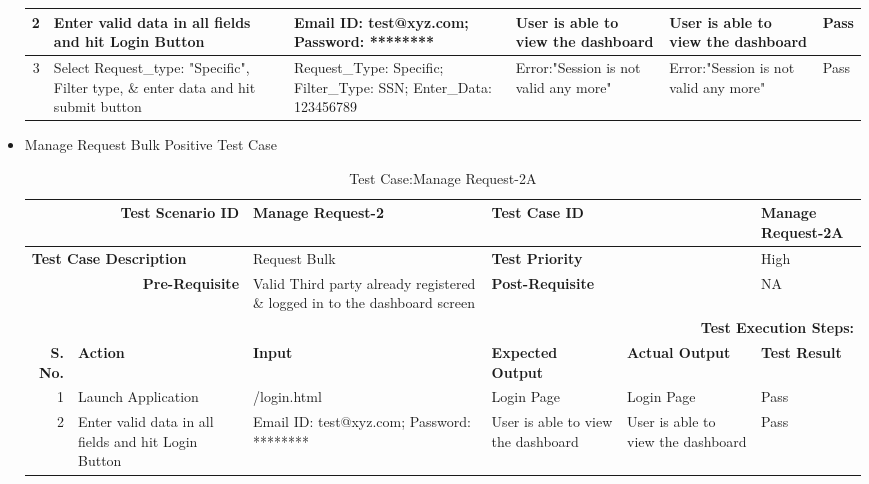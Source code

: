 \documentclass[a4paper, hidelinks, 12pt]{report}
\begin{document}
\begin{itemize}
\begin{table}[H]
\begin{tabular}{|r|p{4.355em}|p{7.715em}|p{6.43em}|p{5.855em}|p{5.07em}|}
    \midrule
    2     & Enter valid data in all fields and hit Login Button & Email ID: test@xyz.com; Password: ******** & User is able to view the dashboard & User is able to view the dashboard & Pass \\
    \midrule
    3     & Select Request\_type: "Specific", Filter type, \& enter data and hit submit button & Request\_Type: Specific; Filter\_Type: SSN; Enter\_Data: 123456789 & Error:"Session is not valid any more" & Error:"Session is not valid any more" & Pass \\
    \bottomrule
    \end{tabular}%
  \label{tab:Test Case:Manage_Request-1B}%
\end{table}%
\item{Manage Request Bulk Positive Test Case}
\begin{table}[H]
  \centering
  \caption{Test Case:Manage Request-2A}
    \begin{tabular}{|r|p{4.355em}|p{7.715em}|p{6.43em}|p{5.855em}|p{5.07em}|}
    \toprule
    \multicolumn{2}{|p{13.425em}|}{\textbf{Test Scenario ID}} & Manage Request-2 & \multicolumn{2}{p{12.285em}|}{\textbf{Test Case ID}} & Manage Request-2A \\
    \midrule
    \multicolumn{2}{|l|}{\multirow{2}[2]{*}{\textbf{Test Case Description}}} & \multirow{2}[2]{*}{Request Bulk} & \multicolumn{2}{l|}{\multirow{2}[2]{*}{\textbf{Test Priority}}} & \multirow{2}[2]{*}{High} \\
    \multicolumn{2}{|l|}{} & \multicolumn{1}{l|}{} & \multicolumn{2}{l|}{} & \multicolumn{1}{l|}{} \\
    \midrule
    \multicolumn{2}{|p{13.425em}|}{\textbf{Pre-Requisite}} & Valid Third party already registered \& logged in to the dashboard screen & \multicolumn{2}{p{12.285em}|}{\textbf{Post-Requisite}} & NA \\
    \midrule
    \multicolumn{6}{p{38.495em}|}{\textbf{Test Execution Steps:}} \\
    \midrule
    \multicolumn{1}{|p{5.07em}|}{\textbf{S. No.}} & \textbf{Action } & \textbf{Input} & \textbf{Expected Output} & \textbf{Actual Output} & \textbf{Test Result} \\
    \midrule
    1     & Launch Application & /login.html & Login Page & Login Page & Pass \\
    \midrule
    2     & Enter valid data in all fields and hit Login Button & Email ID: test@xyz.com; Password: ******** & User is able to view the dashboard & User is able to view the dashboard & Pass \\

\end{tabular}
\end{table}
\end{itemize}
\end{document}
